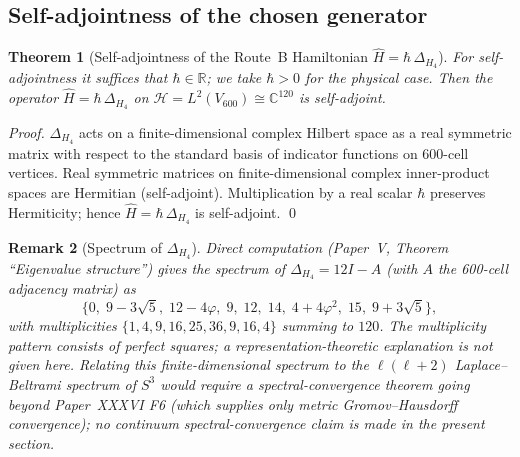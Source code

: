 \documentclass[12pt]{article}
\newtheorem{theorem}{Theorem}
\newtheorem{remark}[theorem]{Remark}
\begin{document}
\subsection{Self-adjointness of the chosen generator}\label{subsec:route_b_selfadjoint}

\begin{theorem}[Self-adjointness of the Route~B Hamiltonian $\hat H = \hbar\,\Delta_{H_4}$]\label{thm:cascade_selfadjoint}
For self-adjointness it suffices that $\hbar \in \mathbb{R}$; we take $\hbar > 0$ for the physical case. Then the operator $\hat H = \hbar\,\Delta_{H_4}$ on $\mathcal{H} = L^2(V_{600}) \cong \mathbb{C}^{120}$ is self-adjoint.
\end{theorem}

\begin{proof}
$\Delta_{H_4}$ acts on a finite-dimensional complex Hilbert space as a real symmetric matrix with respect to the standard basis of indicator functions on 600-cell vertices. Real symmetric matrices on finite-dimensional complex inner-product spaces are Hermitian (self-adjoint). Multiplication by a real scalar $\hbar$ preserves Hermiticity; hence $\hat H = \hbar\,\Delta_{H_4}$ is self-adjoint. \qed
\end{proof}

\begin{remark}[Spectrum of $\Delta_{H_4}$]\label{rem:H4_spectrum}
Direct computation (Paper~V, Theorem ``Eigenvalue structure'') gives the spectrum of $\Delta_{H_4} = 12I - A$ (with $A$ the 600-cell adjacency matrix) as
\[
    \{0,\; 9-3\sqrt{5},\; 12-4\varphi,\; 9,\; 12,\; 14,\; 4 + 4\varphi^2,\; 15,\; 9+3\sqrt{5}\},
\]
with multiplicities $\{1, 4, 9, 16, 25, 36, 9, 16, 4\}$ summing to $120$. The multiplicity pattern consists of perfect squares; a representation-theoretic explanation is not given here. Relating this finite-dimensional spectrum to the $\ell(\ell+2)$ Laplace--Beltrami spectrum of $S^3$ would require a spectral-convergence theorem going beyond Paper~XXXVI F6 (which supplies only metric Gromov--Hausdorff convergence); no continuum spectral-convergence claim is made in the present section.
\end{remark}
\end{document}
